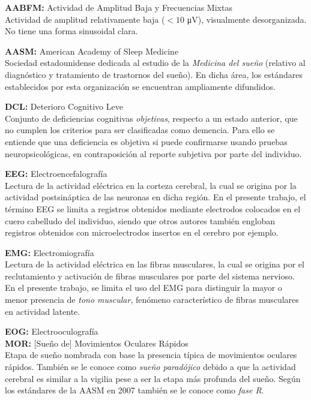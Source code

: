 \documentclass[12pt,letterpaper]{book}
\newcommand{\mv}{\si{\micro\volt}\xspace}
\begin{document}
{
\setlength{\leftskip}{2em}
\setlength{\parindent}{-2em}

\textbf{AABFM:} Actividad de Amplitud Baja y Frecuencias Mixtas \\
Actividad de amplitud relativamente baja ($<10$ \mv), visualmente desorganizada.
No tiene una forma sinusoidal clara.

\textbf{AASM:} American Academy of Sleep Medicine \\
Sociedad estadounidense dedicada al estudio de la \textit{Medicina del sueño} (relativo al 
diagnóstico y tratamiento de trastornos del sueño).
En dicha área, los estándares establecidos por esta organización se encuentran ampliamente 
difundidos.

\textbf{DCL:} Deterioro Cognitivo Leve \\
Conjunto de deficiencias cognitivas \textit{objetivas}, respecto a un estado anterior, que no cumplen los criterios para ser clasificadas como demencia. 
Para ello se entiende que una deficiencia es objetiva si puede confirmarse usando pruebas neuropsicológicas, en contraposición al reporte subjetiva por parte del individuo.

\textbf{EEG:}  Electroencefalografía \\
Lectura de la actividad eléctrica en la corteza cerebral, la cual se origina por la actividad postsináptica de las neuronas en dicha región. 
En el presente trabajo, el término EEG se limita a registros obtenidos mediante electrodos colocados en el cuero cabelludo del individuo, siendo que otros autores también engloban registros obtenidos con microelectrodos insertos en el cerebro por ejemplo.

\textbf{EMG:}  Electromiografía \\
Lectura de la actividad eléctrica en las fibras musculares, la cual se origina por el reclutamiento y activación de fibras musculares por parte del sistema nervioso.
En el presente trabajo, se limita el uso del EMG para distinguir la mayor o menor presencia de \textit{tono muscular}, fenómeno característico de fibras musculares en actividad latente.

\textbf{EOG:}  Electrooculografía \\

\textbf{MOR:} [Sueño de] Movimientos Oculares Rápidos \\
Etapa de sueño nombrada con base la presencia típica de movimientos oculares rápidos. También se le conoce como \textit{sueño paradójico} debido a que la actividad cerebral es similar a la vigilia pese a ser la etapa más profunda del sueño. Según los estándares de la AASM en 2007 también se le conoce como \textit{fase R}.

}
\end{document}
